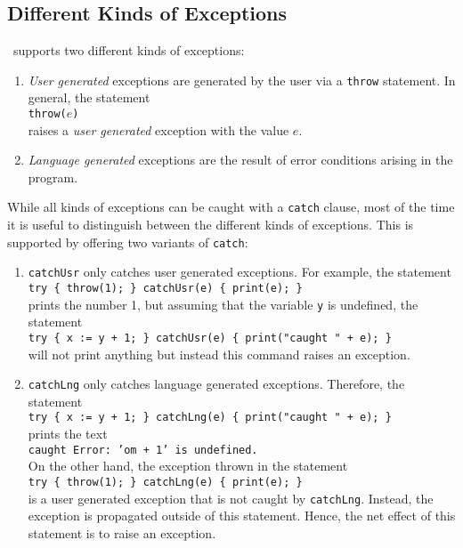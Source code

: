 \subsection{Different Kinds of Exceptions}
\setlx\ supports two different kinds of exceptions:
\begin{enumerate}
\item \emph{User generated} exceptions are generated by the user via a \texttt{throw} statement.
      In general, the statement
      \\[0.2cm]
      \hspace*{1.3cm}
      \texttt{throw($e$)}
      \\[0.2cm]
      raises a \emph{user generated} exception with the value $e$.
\item \emph{Language generated} exceptions are the result of error conditions arising in
      the program. 
\end{enumerate}
While all kinds of exceptions can be caught with a \texttt{catch} clause, most of the time
it is useful to distinguish between the different kinds of exceptions.  This is supported
by offering two variants of \texttt{catch}:
\begin{enumerate}
\item \texttt{catchUsr} only catches user generated exceptions.  For example, the statement
      \\[0.2cm]
      \hspace*{1.3cm}
      \texttt{try \{ throw(1); \} catchUsr(e) \{ print(e); \}}
      \\[0.2cm]
      prints the number 1, but assuming that the variable \texttt{y} is undefined, the 
      statement 
      \\[0.2cm]
      \hspace*{1.3cm}
      \texttt{try \{ x := y + 1; \} catchUsr(e) \{ print("caught " + e); \}}
      \\[0.2cm]
      will not print anything but instead this command raises an exception.
\item \texttt{catchLng} only catches language generated exceptions.  Therefore, the statement
      \\[0.2cm]
      \hspace*{1.3cm}
      \texttt{try \{ x := y + 1; \} catchLng(e) \{ print("caught " + e); \}}
      \\[0.2cm]
      prints the text
      \\[0.2cm]
      \hspace*{1.3cm}
      \texttt{caught Error: 'om + 1' is undefined.}
      \\[0.2cm]
      On the other hand,  the exception thrown in the statement
      \\[0.2cm]
      \hspace*{1.3cm}
      \texttt{try \{ throw(1); \} catchLng(e) \{ print(e); \}}
      \\[0.2cm]
      is a user generated exception that is not caught by \texttt{catchLng}.  Instead, the exception
      is propagated outside of this statement.  Hence, the net effect of this statement is to raise
      an exception.
\end{enumerate}

